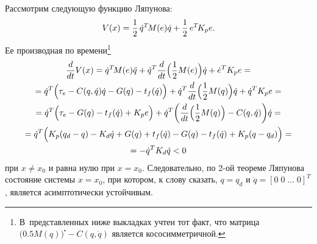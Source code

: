 Рассмотрим следующую функцию Ляпунова:
\begin{equation}
    V(x) = \frac{1}{2} \, \dot{q}^T \! M(e) \dot{q} + \frac{1}{2} \, e^T \! K_p e \ldotp
\end{equation}
Ее производная по времени\footnote{В~представленных ниже выкладках учтен тот факт, что матрица \linebreak $\bigl( 0.5 M(q) \bigr)^\centerdot \!\! - C(q,\dot{q})$ является кососимметричной.}
\begin{gather}
    \frac{d}{dt} V(x) = \dot{q}^T \! M(e) \ddot{q} + \dot{q}^T \frac{d}{dt} \Bigl( \frac{1}{2} M(e) \Bigr) \dot{q} + \dot{e}^T K_p e = \notag \\
    = \dot{q}^T \Bigl( \tau_e - C(q,\dot{q}) \dot{q} - G(q) - t_f(\dot{q}) \Bigr) + \dot{q}^T \frac{d}{dt} \Bigl( \frac{1}{2} M(q) \Bigr) \dot{q} + \dot{q}^T K_p e  = \notag\\
    = \dot{q}^T \Bigl( \tau_e - G(q) - t_f(\dot{q}) + K_p e\Bigr) + \dot{q}^T \biggl( \frac{d}{dt} \Bigl( \frac{1}{2} M(q) \Bigr) - C(q,\dot{q}) \biggr) \dot{q} = \notag \\
    = \dot{q}^T \Bigl(K_p (q_d - q) - K_d \dot{q} + G(q) + t_f(\dot{q}) - G(q) - t_f(\dot{q}) + K_p (q - q_d) \Bigr) = \notag \\
    = -\dot{q}^T K_d \dot{q} < 0
\end{gather}
при $x \ne x_0$ и равна нулю при $x = x_0$.
Следовательно, по 2-ой теореме Ляпунова состояние системы $x = x_0$, при котором, к слову сказать, $q = q_d$ и $\dot{q} = [0\;0\;\ldots\;0]^T$, является асимптотически устойчивым.

\newpage
